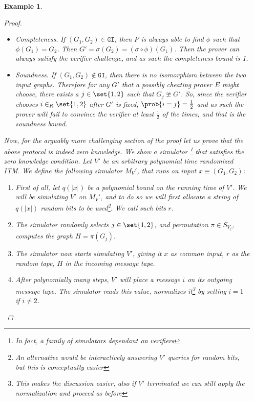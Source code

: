 \documentclass{article}
\newtheorem{example}{Example}
\begin{document}
\begin{example}
\begin{proof}
        \begin{itemize}
            \item Completeness. If $(G_1, G_2) \in \texttt{GI}$, then $P$ is always able to find $\phi$ such that
                  $\phi(G_1) = G_2$. Then $G' = \sigma(G_2) = (\sigma \circ \phi) (G_1)$. Then the prover can always satisfy the verifier challenge,
                  and as such the completeness bound is 1.
            \item Soundness. If $(G_1, G_2) \notin \texttt{GI}$, then there is no isomorphism between the two input graphs. Therefore for any $G'$ that a
                  possibly cheating prover $E$ might choose, there exists a $j \in \set{1, 2}$ such that $G_j \ncong G'$. So, since the verifier chooses $i \in_R \set{1, 2}$ after $G'$ is fixed, $\prob{i = j} = \frac{1}{2}$ and as such the prover will fail to convince the verifier
                  at least $\frac{1}{2}$ of the times, and that is the soundness bound.
        \end{itemize}
        Now, for the arguably more challenging section of the proof let us prove that the above protocol is indeed zero knowledge.
        We show a simulator \footnote{In fact, a family of simulators dependant on verifiers} that satisfies the zero knowledge condition.
        Let $V'$ be an arbitrary polynomial time randomized ITM. We define the following simulator $M_V'$, that runs on input $x \equiv (G_1, G_2)$:
        \begin{enumerate}
            \item First of all, let $q(|x|)$ be a polynomial bound on the running time of $V'$. We will be simulating $V'$ on $M_V'$, and to do so we will first allocate a string of $q(|x|)$ random bits to be used\footnote{An alternative would be interactively answering $V'$ queries for random bits, but this is conceptually easier}. We call such bits $r$.
            \item The simulator randomly selects $j \in \set{1, 2 }$, and permutation $\pi \in S_{V_j}$, computes the graph $H = \pi(G_j)$.
            \item The simulator now starts simulating $V'$, giving it $x$ as common input, $r$ as the random tape, $H$ in the incoming message tape.
            \item After polynomially many steps, $V'$ will place a message $i$ on its outgoing message tape. The simulator reads this value, normalizes it\footnote{This makes the discussion easier, also if $V'$ terminated we can still apply the normalization and proceed as before} by setting $i = 1$ if $i \neq 2$.

\end{enumerate}
\end{proof}
\end{example}
\end{document}
